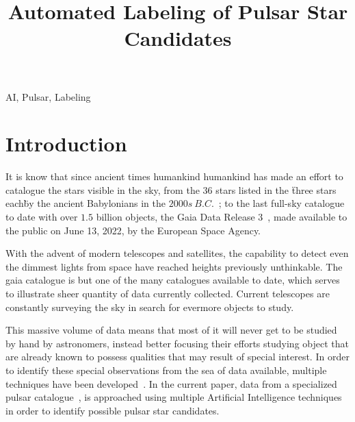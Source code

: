 \documentclass[journal]{IEEEtran}
\begin{document}
\title{Automated Labeling of Pulsar Star Candidates}

\author{
    }

\maketitle

\listoftodos

\begin{abstract}
\end{abstract}

\begin{IEEEkeywords}
    AI, Pulsar, Labeling
\end{IEEEkeywords}

\section{Introduction\label{sec:intro}} 
It is know that since ancient times
humankind humankind has made an effort to catalogue the stars visible in the
sky, from the $36$ stars listed in the \"three stars each\" by the ancient
Babylonians in the $2000s\ B.C.$~\cite{astronomy:history:north}; to the last
full-sky catalogue to date with over $1.5$ billion objects, the Gaia Data
Release 3~\cite{gaia:dr3:esa}, made available to the public on June 13, 2022, by
the European Space Agency.

With the advent of modern telescopes and satellites, the capability to detect
even the dimmest lights from space have reached heights previously unthinkable.
The gaia catalogue is but one of the many catalogues available to date, which
serves to illustrate sheer quantity of data currently collected. Current
telescopes are constantly surveying the sky in search for evermore objects to
study.

This massive volume of data means that most of it will never get to be studied
by hand by astronomers, instead better focusing their efforts studying object
that are already known to possess qualities that may result of special interest.
In order to identify these special observations from the sea of data available,
multiple techniques have been developed~\cite{pulsar:dataset:explanation:lyon}.
In the current paper, data from a specialized pulsar
catalogue~\cite{pulsar:dataset:lyon}, is approached using multiple Artificial
Intelligence techniques in order to identify possible pulsar star candidates.
\end{document}
